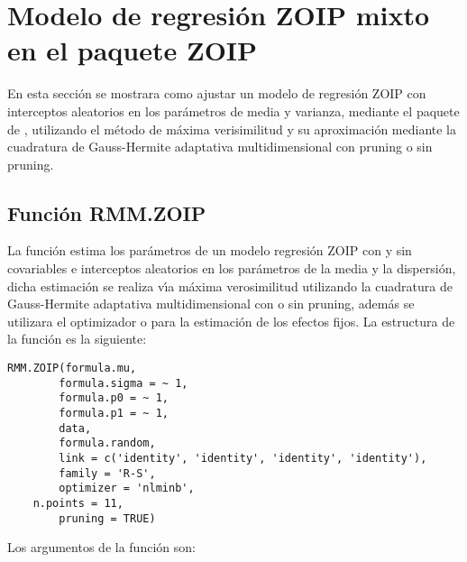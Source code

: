 \section{Modelo de regresi\'{o}n ZOIP mixto en el paquete ZOIP}

En esta secci\'{o}n se mostrara como ajustar un modelo de regresi\'{o}n ZOIP con interceptos aleatorios en los par\'{a}metros de media y varianza, mediante el paquete  de , utilizando el m\'{e}todo de m\'{a}xima verisimilitud y su aproximaci\'{o}n mediante la cuadratura de Gauss-Hermite adaptativa multidimensional con pruning o sin pruning.

\subsection{Funci\'{o}n RMM.ZOIP} 

La funci\'{o}n  estima los par\'{a}metros de un modelo regresi\'{o}n ZOIP con y sin covariables e interceptos aleatorios en los par\'{a}metros de la media y la dispersi\'{o}n, dicha estimaci\'{o}n se realiza v\'{\i}a m\'{a}xima verosimilitud utilizando la cuadratura de Gauss-Hermite adaptativa multidimensional con o sin pruning, adem\'{a}s se utilizara el optimizador  o  para la estimaci\'{o}n de los efectos fijos. La estructura de la funci\'{o}n  es la siguiente:

\begin{verbatim}
RMM.ZOIP(formula.mu, 
		formula.sigma = ~ 1,
		formula.p0 = ~ 1,
		formula.p1 = ~ 1,
		data,
		formula.random,
		link = c('identity', 'identity', 'identity', 'identity'),
		family = 'R-S',
		optimizer = 'nlminb',
    n.points = 11,
		pruning = TRUE)
\end{verbatim}

Los argumentos de la funci\'{o}n  son:


